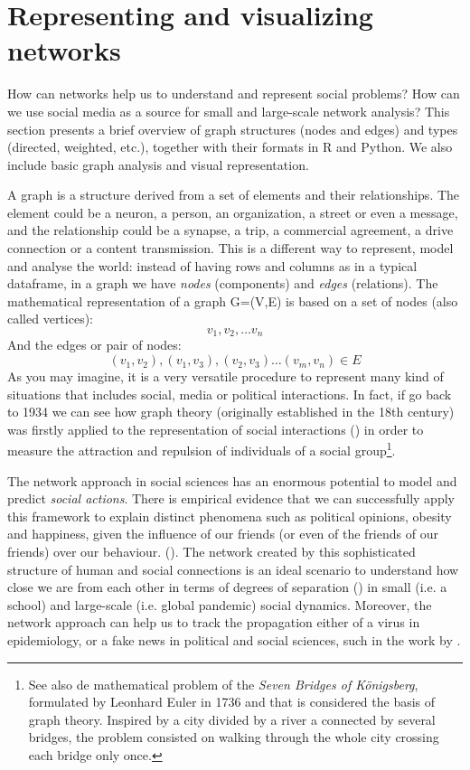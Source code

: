 \section{Representing and visualizing networks}
\label{sec:graph}

How can networks help us to understand and represent social problems? How can we use social media as a source for small and large-scale network analysis? This section presents a brief overview of graph structures (nodes and edges) and types (directed, weighted, etc.), together with their formats in R and Python. We also include basic graph analysis and visual representation. 
 
A graph is a structure derived from a set of elements and their relationships. The element could be a neuron, a person, an organization, a street or even a message, and the relationship could be a synapse, a trip, a commercial agreement, a drive connection or a content transmission. This is a different way to represent, model and analyse the world: instead of having rows and columns as in a typical dataframe, in a graph we have \textit{nodes} (components) and \textit{edges} (relations). The mathematical representation of a graph G=(V,E) is based on a set of nodes (also called vertices): \[{v_{1}, v_{2},… v_{n}}\] And the edges or pair of nodes: \[{(v_{1}, v_{2}), (v_{1}, v_{3}), (v_{2},v_{3}) … (v_{m}, v_{n}) \in E}\] As you may imagine, it is a very versatile procedure to represent many kind of situations that includes social, media or political interactions. In fact, if go back to 1934 we can see how graph theory (originally established in the 18th century) was firstly applied to the representation of social interactions (\cite{moreno1934shall}) in order to measure the attraction and repulsion of individuals of a social group\footnote{See also de mathematical problem of the \textit{Seven Bridges of Königsberg}, formulated by Leonhard Euler in 1736 and that is considered the basis of graph theory. Inspired by a city divided by a river a connected by several bridges, the problem consisted on walking through the whole city crossing each bridge only once.}.

The network approach in social sciences has an enormous potential to model and predict \textit{social actions}. There is empirical evidence that we can successfully apply this framework to explain distinct phenomena such as political opinions, obesity and happiness, given the influence of our friends (or even of the friends of our friends) over our behaviour. (\cite{christakis2009connected}). The network created by this sophisticated structure of human and social connections is an ideal scenario to understand how close we are from each other in terms of degrees of separation (\cite{watts2004six}) in small (i.e. a school) and large-scale (i.e. global pandemic) social dynamics. Moreover, the network approach can help us to track the propagation either of a virus in epidemiology, or a fake news in political and social sciences, such in the work by 
\citet{vosoughi2018spread}. 

